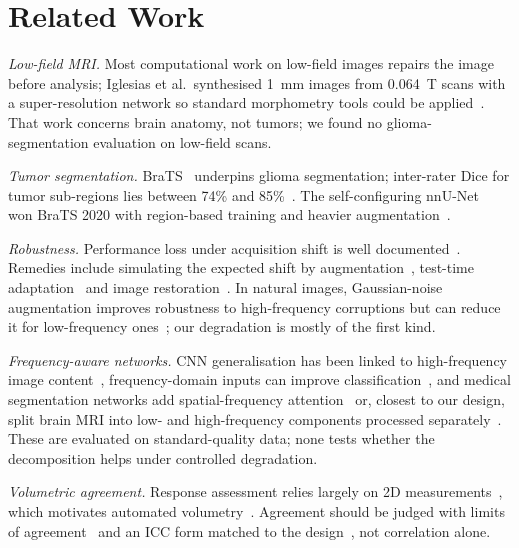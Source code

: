 \documentclass[conference]{IEEEtran}
\begin{document}
\section{Related Work}

\textit{Low-field MRI.} Most computational work on low-field images repairs the image before analysis; Iglesias
et al.\ synthesised 1~mm images from 0.064~T scans with a super-resolution network so standard morphometry tools
could be applied~\cite{iglesias2023superres}. That work concerns brain anatomy, not tumors; we found no
glioma-segmentation evaluation on low-field scans.

\textit{Tumor segmentation.} BraTS~\cite{menze2015brats,bakas2017tcga,bakas2018brats} underpins glioma
segmentation; inter-rater Dice for tumor sub-regions lies between 74\% and 85\%~\cite{menze2015brats}. The
self-configuring nnU-Net~\cite{isensee2021nnunet} won BraTS 2020 with region-based training and heavier
augmentation~\cite{isensee2020bratsnnunet}.

\textit{Robustness.} Performance loss under acquisition shift is well documented~\cite{karani2021testtime}.
Remedies include simulating the expected shift by augmentation~\cite{zhang2020bigaug}, test-time
adaptation~\cite{karani2021testtime} and image restoration~\cite{iglesias2023superres}. In natural images,
Gaussian-noise augmentation improves robustness to high-frequency corruptions but can reduce it for
low-frequency ones~\cite{yin2019fourier}; our degradation is mostly of the first kind.

\textit{Frequency-aware networks.} CNN generalisation has been linked to high-frequency image
content~\cite{wang2020highfreq}, frequency-domain inputs can improve classification~\cite{xu2020frequency}, and
medical segmentation networks add spatial-frequency attention~\cite{zhou2024sfunet} or, closest to our design,
split brain MRI into low- and high-frequency components processed separately~\cite{shao2025hffnet}. These are
evaluated on standard-quality data; none tests whether the decomposition helps under controlled degradation.

\textit{Volumetric agreement.} Response assessment relies largely on 2D measurements~\cite{wen2010rano}, which
motivates automated volumetry~\cite{kickingereder2019automated,chang2019autorano}. Agreement should be judged
with limits of agreement~\cite{bland1986agreement} and an ICC form matched to the design~\cite{shrout1979icc},
not correlation alone.
\end{document}
